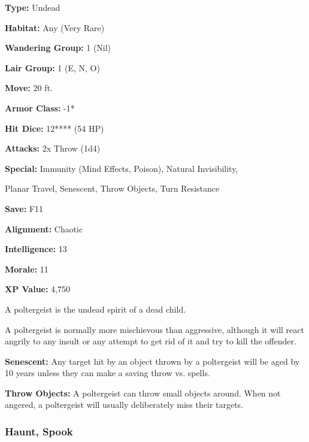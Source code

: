 \begin{multicols*}{2}
{\textbf{Type:} Undead

\textbf{Habitat:} Any (Very Rare)

\textbf{Wandering Group:} 1 (Nil)

\textbf{Lair Group:} 1 (E, N, O)

\textbf{Move:} 20 ft.

\textbf{Armor Class:} -1*

\textbf{Hit Dice:} 12**** (54 HP)

\textbf{Attacks:} 2x Throw (1d4)

\textbf{Special:} Immunity (Mind Effects, Poison), Natural Invisibility, 

Planar Travel, Senescent, Throw Objects, Turn Resistance

\textbf{Save:} F11

\textbf{Alignment:} Chaotic

\textbf{Intelligence:} 13

\textbf{Morale:} 11

\textbf{XP Value:} 4,750}

A poltergeist is the undead spirit of a dead child.

A poltergeist is normally more mischievous than aggressive, although it will react angrily to any insult or any attempt to get rid of it and try to kill the offender.

\textbf{Senescent:} Any target hit by an object thrown by a poltergeist will be aged by 10 years unless they can make a saving throw vs. spells.

\textbf{Throw Objects:} A poltergeist can throw small objects around. When not angered, a poltergeist will usually deliberately miss their targets.

\subsubsection{Haunt, Spook}
\end{multicols*}
